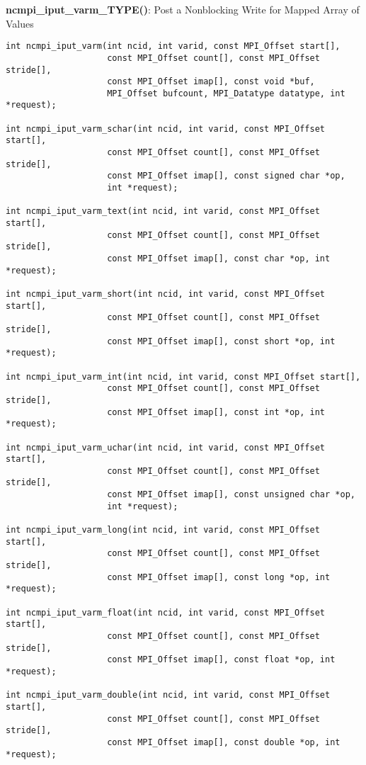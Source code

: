 {\bf ncmpi\_iput\_varm\_TYPE()}: Post a Nonblocking Write for Mapped Array of Values

\begin{verbatim}
int ncmpi_iput_varm(int ncid, int varid, const MPI_Offset start[],
                    const MPI_Offset count[], const MPI_Offset stride[],
                    const MPI_Offset imap[], const void *buf,
                    MPI_Offset bufcount, MPI_Datatype datatype, int *request);

int ncmpi_iput_varm_schar(int ncid, int varid, const MPI_Offset start[],
                    const MPI_Offset count[], const MPI_Offset stride[],
                    const MPI_Offset imap[], const signed char *op,
                    int *request);

int ncmpi_iput_varm_text(int ncid, int varid, const MPI_Offset start[],
                    const MPI_Offset count[], const MPI_Offset stride[],
                    const MPI_Offset imap[], const char *op, int *request);

int ncmpi_iput_varm_short(int ncid, int varid, const MPI_Offset start[],
                    const MPI_Offset count[], const MPI_Offset stride[],
                    const MPI_Offset imap[], const short *op, int *request);

int ncmpi_iput_varm_int(int ncid, int varid, const MPI_Offset start[],
                    const MPI_Offset count[], const MPI_Offset stride[],
                    const MPI_Offset imap[], const int *op, int *request);

int ncmpi_iput_varm_uchar(int ncid, int varid, const MPI_Offset start[],
                    const MPI_Offset count[], const MPI_Offset stride[],
                    const MPI_Offset imap[], const unsigned char *op,
                    int *request);

int ncmpi_iput_varm_long(int ncid, int varid, const MPI_Offset start[],
                    const MPI_Offset count[], const MPI_Offset stride[],
                    const MPI_Offset imap[], const long *op, int *request);

int ncmpi_iput_varm_float(int ncid, int varid, const MPI_Offset start[],
                    const MPI_Offset count[], const MPI_Offset stride[],
                    const MPI_Offset imap[], const float *op, int *request);

int ncmpi_iput_varm_double(int ncid, int varid, const MPI_Offset start[],
                    const MPI_Offset count[], const MPI_Offset stride[],
                    const MPI_Offset imap[], const double *op, int *request);
\end{verbatim}


